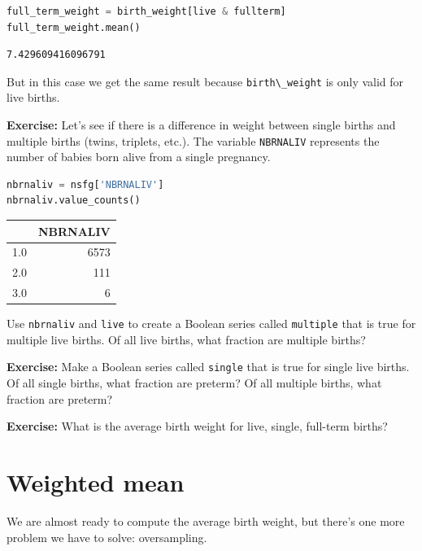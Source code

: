 \begin{lstlisting}[language=Python]
full_term_weight = birth_weight[live & fullterm]
full_term_weight.mean()
\end{lstlisting}

\begin{lstlisting}[]
7.429609416096791
\end{lstlisting}

But in this case we get the same result because
\passthrough{\lstinline!birth\_weight!} is only valid for live births.

\textbf{Exercise:} Let's see if there is a difference in weight between
single births and multiple births (twins, triplets, etc.). The variable
\passthrough{\lstinline!NBRNALIV!} represents the number of babies born
alive from a single pregnancy.

\begin{lstlisting}[language=Python]
nbrnaliv = nsfg['NBRNALIV']
nbrnaliv.value_counts()
\end{lstlisting}

\begin{tabular}{lr}
\toprule
{} &  NBRNALIV \\
\midrule
1.0 &      6573 \\
2.0 &       111 \\
3.0 &         6 \\
\bottomrule
\end{tabular}

Use \passthrough{\lstinline!nbrnaliv!} and
\passthrough{\lstinline!live!} to create a Boolean series called
\passthrough{\lstinline!multiple!} that is true for multiple live
births. Of all live births, what fraction are multiple births?

\textbf{Exercise:} Make a Boolean series called
\passthrough{\lstinline!single!} that is true for single live births. Of
all single births, what fraction are preterm? Of all multiple births,
what fraction are preterm?

\textbf{Exercise:} What is the average birth weight for live, single,
full-term births?

\hypertarget{weighted-mean}{%
\section{Weighted mean}\label{weighted-mean}}

We are almost ready to compute the average birth weight, but there's one
more problem we have to solve: oversampling.

